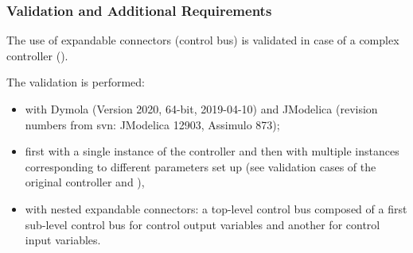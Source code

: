 \documentclass[letterpaper,10pt, openany,english]{sphinxmanual}
\begin{document}
\subsubsection{Validation and Additional Requirements}
\label{\detokenize{requirements:validation-and-additional-requirements}}
The use of expandable connectors (control bus) is validated in case of a complex controller ().

The validation is performed:
\begin{itemize}
\item {} 
with Dymola (Version 2020, 64-bit, 2019-04-10) and JModelica (revision numbers from svn: JModelica 12903, Assimulo 873);

\item {} 
first with a single instance of the controller and then with multiple instances corresponding to different parameters set up (see validation cases of the original controller  and ),

\item {} 
with nested expandable connectors: a top-level control bus composed of a first sub-level control bus for control output variables and another for control input variables.

\end{itemize}
\end{document}
